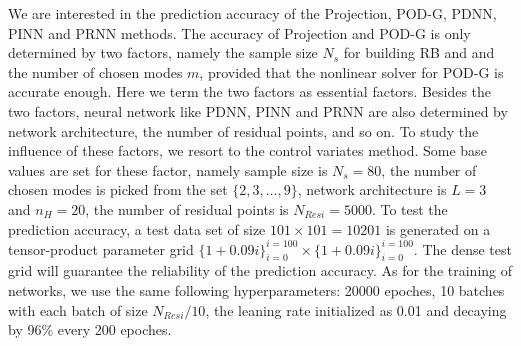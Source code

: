 \documentclass[preprint, 10pt]{elsarticle}
\begin{document}
We are interested in the prediction accuracy of the Projection, POD-G, PDNN, PINN and PRNN methods. The accuracy of Projection and POD-G is only determined by two factors, namely the sample size $N_s$ for building RB and and the number of chosen modes $m$, provided that the nonlinear solver for POD-G is accurate enough. Here we term the two factors as essential factors.
Besides the two factors, neural network like PDNN, PINN and PRNN are also determined by network architecture, the number of residual points, and so on. To study the influence of these factors, we resort to the control variates method. Some base values are set for these factor, namely sample size is $N_s=80$, the number of chosen modes is picked from the set $\{2,3,...,9\}$,  network architecture is $L=3$ and $n_H=20$, the number of residual points is $N_{Resi}=5000$. To test the prediction accuracy, a test data set of size $101 \times 101=10201$ is generated on a tensor-product parameter grid $\{1+ 0.09i\}_{i=0}^{i=100} \times \{1+ 0.09i\}_{i=0}^{i=100}$. The dense test grid will guarantee the reliability of the prediction accuracy. As for the training of networks, we use the same following hyperparameters: 20000 epoches, 10 batches with each batch of size $N_{Resi}/10$, the leaning rate initialized as 0.01 and decaying by 96\% every 200 epoches.
\end{document}
